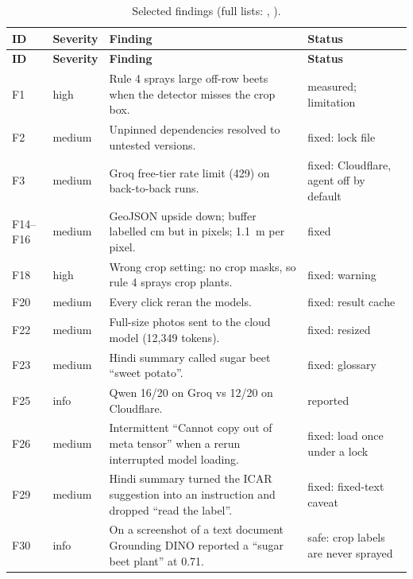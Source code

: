 \begin{small}
\begin{longtable}{@{}L{1.4cm}L{1.4cm}L{7.6cm}L{3.0cm}@{}}
\caption{Selected findings (full lists: , ).}\label{tab:findings}\\
\toprule
\textbf{ID} & \textbf{Severity} & \textbf{Finding} & \textbf{Status}\\
\midrule\endfirsthead
\toprule
\textbf{ID} & \textbf{Severity} & \textbf{Finding} & \textbf{Status}\\
\midrule\endhead
F1 & high & Rule 4 sprays large off-row beets when the detector misses the crop box. & measured; limitation\\
F2 & medium & Unpinned dependencies resolved to untested versions. & fixed: lock file\\
F3 & medium & Groq free-tier rate limit (429) on back-to-back runs. & fixed: Cloudflare, agent off by default\\
F14--F16 & medium & GeoJSON upside down; buffer labelled cm but in pixels; 1.1~m per pixel. & fixed\\
F18 & high & Wrong crop setting: no crop masks, so rule 4 sprays crop plants. & fixed: warning\\
F20 & medium & Every click reran the models. & fixed: result cache\\
F22 & medium & Full-size photos sent to the cloud model (12,349 tokens). & fixed: resized\\
F23 & medium & Hindi summary called sugar beet ``sweet potato''. & fixed: glossary\\
F25 & info & Qwen 16/20 on Groq vs 12/20 on Cloudflare. & reported\\
F26 & medium & Intermittent ``Cannot copy out of meta tensor'' when a rerun interrupted model loading. & fixed: load once under a lock\\
F29 & medium & Hindi summary turned the ICAR suggestion into an instruction and dropped ``read the label''. & fixed: fixed-text caveat\\
F30 & info & On a screenshot of a text document Grounding DINO reported a ``sugar beet plant'' at 0.71. & safe: crop labels are never sprayed\\
\bottomrule
\end{longtable}
\end{small}

